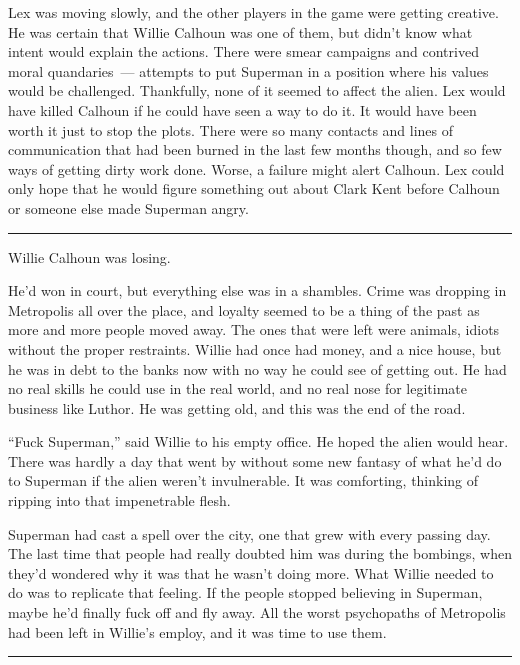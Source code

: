 \documentclass[ebook,12pt]{memoir}
\begin{document}
Lex was moving slowly, and the other players in the game were getting
creative. He was certain that Willie Calhoun was one of them, but didn't
know what intent would explain the actions. There were smear campaigns
and contrived moral quandaries~--- attempts to put Superman in a
position where his values would be challenged. Thankfully, none of it
seemed to affect the alien. Lex would have killed Calhoun if he could
have seen a way to do it. It would have been worth it just to stop the
plots. There were so many contacts and lines of communication that had
been burned in the last few months though, and so few ways of getting
dirty work done. Worse, a failure might alert Calhoun. Lex could only
hope that he would figure something out about Clark Kent before Calhoun
or someone else made Superman angry.

\begin{center}\rule{0.5\linewidth}{\linethickness}\end{center}

Willie Calhoun was losing.

He'd won in court, but everything else was in a shambles. Crime was
dropping in Metropolis all over the place, and loyalty seemed to be a
thing of the past as more and more people moved away. The ones that were
left were animals, idiots without the proper restraints. Willie had once
had money, and a nice house, but he was in debt to the banks now with no
way he could see of getting out. He had no real skills he could use in
the real world, and no real nose for legitimate business like Luthor. He
was getting old, and this was the end of the road.

``Fuck Superman,'' said Willie to his empty office. He hoped the alien
would hear. There was hardly a day that went by without some new fantasy
of what he'd do to Superman if the alien weren't invulnerable. It was
comforting, thinking of ripping into that impenetrable flesh.

Superman had cast a spell over the city, one that grew with every
passing day. The last time that people had really doubted him was during
the bombings, when they'd wondered why it was that he wasn't doing more.
What Willie needed to do was to replicate that feeling. If the people
stopped believing in Superman, maybe he'd finally fuck off and fly away.
All the worst psychopaths of Metropolis had been left in Willie's
employ, and it was time to use them.

\begin{center}\rule{0.5\linewidth}{\linethickness}\end{center}
\end{document}
